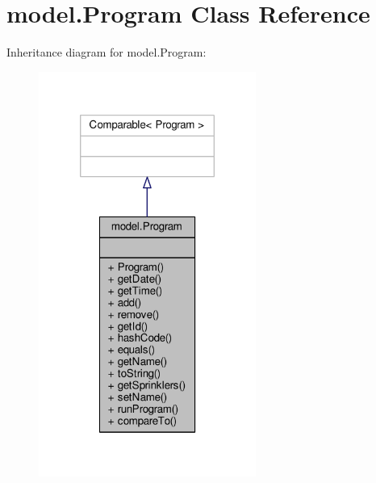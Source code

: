 \hypertarget{classmodel_1_1Program}{\section{model.\-Program Class Reference}
\label{classmodel_1_1Program}
}


Inheritance diagram for model.\-Program\-:\nopagebreak
\begin{figure}[H]
\begin{center}
\leavevmode
\includegraphics[width=202pt]{classmodel_1_1Program__inherit__graph}
\end{center}
\end{figure}



